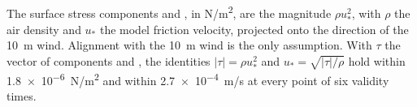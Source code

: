 The surface stress components  and , in \si{N/m^2}, are the magnitude
$\rho u_*^2$, with $\rho$ the air density and $u_*$ the model friction velocity, projected onto the
direction of the \SI{10}{m} wind. Alignment with the \SI{10}{m} wind is the only assumption. With
$\tau$ the vector of components  and , the identities $|\tau| = \rho u_*^2$
and $u_* = \sqrt{|\tau|/\rho}$ hold within \SI{1.8e-6}{N/m^2} and within \SI{2.7e-4}{m/s} at every
point of six validity times.
